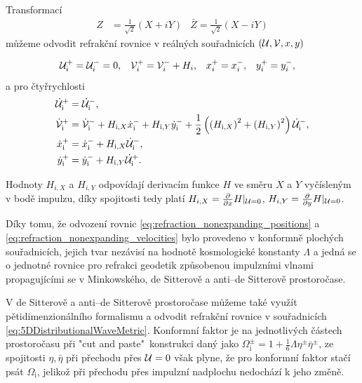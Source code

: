 Transformací
\begin{align}
    Z &= \frac{1}{\sqrt{2}}\left(X + i Y\right) & \bar{Z} = \frac{1}{\sqrt{2}}\left(X - i Y\right)
\end{align}
můžeme odvodit refrakční rovnice v reálných souřadnicích $(\mathcal{U}, \mathcal{V}, x, y)$

\begin{align}
    \label{eq:kartezske_refrakcni_rovnice}
        \mathcal{U}_i^{+} &= \mathcal{U}_i^{-} = 0, & 
        \mathcal{V}_i^{+} &= \mathcal{V}_i^{-} + H_i, &
        x_i^{+} &= x_i^{-}, & 
        y_i^{+} &= y_i^{-},
\end{align}
a pro čtyřrychlosti
\begin{equation}
    \label{eq:refraction_velocity_null_cart}
    \begin{split}
        \dot {\mathcal{U}}_{\mathrm{i}}^{+} &= \dot {\mathcal{U}}_{\mathrm{i}}^{-}, \\
        \dot {\mathcal{V}}_{\mathrm{i}}^{+} &= \dot {\mathcal{V}}_{\mathrm{i}}^{-} + H_{\mathrm{i}, X} \dot x_{\mathrm{i}}^{-} + H_{\mathrm{i}, Y} \dot y_{\mathrm{i}}^{-} + \frac{1}{2}\left(\left(H_{\mathrm{i}, X}\right)^2 + \left(H_{\mathrm{i}, Y}\right)^2\right) \dot {\mathcal{U}}_{\mathrm{i}}^{-}, \\
        \dot x_{\mathrm{i}}^{+} &= \dot x_{\mathrm{i}}^{-} + H_{\mathrm{i}, X} \dot {\mathcal{U}}_{\mathrm{i}}^{-}, \\
        \dot y_{\mathrm{i}}^{+} &= \dot y_{\mathrm{i}}^{-} + H_{\mathrm{i}, Y} \dot {\mathcal{U}}_{\mathrm{i}}^{+}.
    \end{split}
\end{equation}

Hodnoty $H_{i,X}$ a $H_{i, Y}$ odpovídají derivacím funkce $H$ ve směru $X$ a $Y$ vyčísleným v bodě impulzu, díky spojitosti tedy platí
$H_{i,X} = \frac{\partial}{\partial x} H\vert_{\mathcal{U}=0}$, $H_{i,Y} = \frac{\partial}{\partial y} H\vert_{\mathcal{U}=0}$.

Díky tomu, že odvození rovnic \eqref{eq:refraction_nonexpanding_positions} a \eqref{eq:refraction_nonexpanding_velocities} bylo provedeno v konformně plochých souřadnicích,
jejich tvar nezávisí na hodnotě kosmologické konstanty $\Lambda$ a jedná se o jednotné rovnice pro refrakci geodetik způsobenou impulzními vlnami propagujícími se v
Minkowského, de Sitterově a anti--de Sitterově prostoročase.

V de Sitterově a anti--de Sitterově prostoročase můžeme také využít pětidimenzionálního formalismu a odvodit refrakční rovnice v souřadnicích \eqref{eq:5DDistributionalWaveMetric}.
Konformní faktor je na jednotlivých částech prostoročasu při "cut and paste"\ konstrukci daný jako $\Omega^{\pm}_{\mathrm{i}} = 1 + \frac{1}{6} \Lambda \eta^{\pm} \bar{\eta}^{\pm}$,
ze spojitosti $\eta, \bar{\eta}$ při přechodu přes $\mathcal{U}=0$
však plyne, že pro konformní faktor stačí psát $\Omega_{\mathrm{i}}$, jelikož při přechodu přes impulzní nadplochu nedochází k jeho změně.

